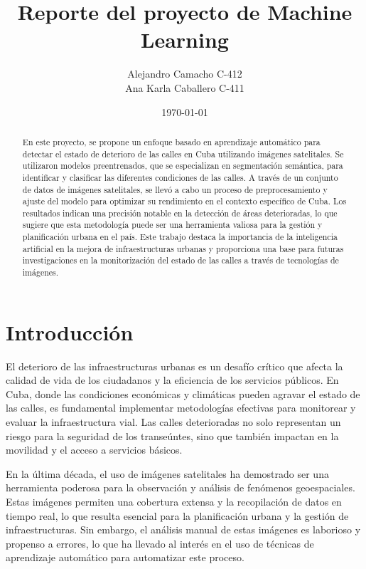 \documentclass{article}
\title{Reporte del proyecto de Machine Learning}
\author{Alejandro Camacho C-412 \\ Ana Karla Caballero C-411}
\date{\today}
\begin{document}
\maketitle

\begin{abstract}
    En este proyecto, se propone un enfoque basado en aprendizaje automático para detectar el estado de deterioro de las calles en Cuba utilizando imágenes satelitales. Se utilizaron modelos preentrenados, que se especializan en segmentación semántica, para identificar y clasificar las diferentes condiciones de las calles. A través de un conjunto de datos de imágenes satelitales, se llevó a cabo un proceso de preprocesamiento y ajuste del modelo para optimizar su rendimiento en el contexto específico de Cuba. Los resultados indican una precisión notable en la detección de áreas deterioradas, lo que sugiere que esta metodología puede ser una herramienta valiosa para la gestión y planificación urbana en el país. Este trabajo destaca la importancia de la inteligencia artificial en la mejora de infraestructuras urbanas y proporciona una base para futuras investigaciones en la monitorización del estado de las calles a través de tecnologías de imágenes.
\end{abstract}

\section{Introducción}
El deterioro de las infraestructuras urbanas es un desafío crítico que afecta la calidad de vida de los ciudadanos y la eficiencia de los servicios públicos. En Cuba, donde las condiciones económicas y climáticas pueden agravar el estado de las calles, es fundamental implementar metodologías efectivas para monitorear y evaluar la infraestructura vial. Las calles deterioradas no solo representan un riesgo para la seguridad de los transeúntes, sino que también impactan en la movilidad y el acceso a servicios básicos.

En la última década, el uso de imágenes satelitales ha demostrado ser una herramienta poderosa para la observación y análisis de fenómenos geoespaciales. Estas imágenes permiten una cobertura extensa y la recopilación de datos en tiempo real, lo que resulta esencial para la planificación urbana y la gestión de infraestructuras. Sin embargo, el análisis manual de estas imágenes es laborioso y propenso a errores, lo que ha llevado al interés en el uso de técnicas de aprendizaje automático para automatizar este proceso.
\end{document}
